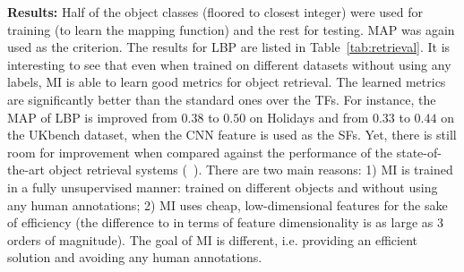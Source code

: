 \documentclass[10pt,twocolumn,letterpaper]{article}
\begin{document}
\textbf{Results:} Half of the object classes (floored to closest integer) were used for training 
(to learn the mapping function) and the rest for testing. 
MAP was again used as the criterion.  The results for
LBP are listed in Table~\ref{tab:retrieval}.  %
It is interesting to see that even when trained on different datasets
without using any labels, MI is able to learn good metrics for object
retrieval. The learned metrics are significantly better than the
standard ones over the TFs. For instance, the MAP of LBP 
is improved from $0.38$ to $0.50$ on Holidays and from $0.33$ to
$0.44$ on the UKbench dataset, when the CNN feature is used as the SFs. Yet, there is still room for
improvement when compared against the performance of the
state-of-the-art object retrieval systems
(\eg~\cite{qin:bmvc14}). There are two main reasons: 1) MI is trained in a fully unsupervised manner:
trained on different objects and without using any human annotations; 2) MI uses cheap, low-dimensional features for
the sake of efficiency (the difference to \cite{qin:bmvc14} in terms
of feature dimensionality is as large as 3 orders of magnitude). The
goal of MI is different, i.e. providing an efficient solution and avoiding
any human annotations.
\end{document}
